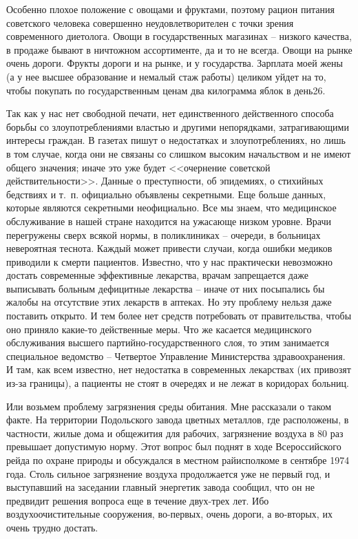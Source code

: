 \documentclass{book}
\begin{document}
Особенно плохое положение с овощами и фруктами, поэтому рацион питания советского человека совершенно неудовлетворителен с точки 
зрения современного диетолога. Овощи в государственных магазинах -- низкого качества, в продаже бывают в ничтожном ассортименте, 
да и то не всегда. Овощи на рынке очень дороги. Фрукты дороги и на рынке, и у государства. Зарплата моей жены (а у нее высшее 
образование и немалый стаж работы) целиком уйдет на то, чтобы покупать по государственным ценам два килограмма яблок в день26.

Так как у нас нет свободной печати, нет единственного действенного способа борьбы со злоупотреблениями властью и другими 
непорядками, затрагивающими интересы граждан. В газетах пишут о недостатках и злоупотреблениях, но лишь в том случае, когда они 
не связаны со слишком высоким начальством и не имеют общего значения; иначе это уже будет <<очернение советской 
действительности>>. Данные о преступности, об эпидемиях, о стихийных бедствиях и т.~п. официально объявлены секретными. Еще 
больше данных, которые являются секретными неофициально. Все мы знаем, что медицинское обслуживание в нашей стране находится на 
ужасающе низком уровне. Врачи перегружены сверх всякой нормы, в поликлиниках -- очереди, в больницах невероятная теснота. Каждый 
может привести случаи, когда ошибки медиков приводили к смерти пациентов. Известно, что у нас практически невозможно достать 
современные эффективные лекарства, врачам запрещается даже выписывать больным дефицитные лекарства -- иначе от них посыпались бы 
жалобы на отсутствие этих лекарств в аптеках. Но эту проблему нельзя даже поставить открыто. И тем более нет средств потребовать 
от правительства, чтобы оно приняло какие-то действенные меры. Что же касается медицинского обслуживания высшего 
партийно-государственного слоя, то этим занимается специальное ведомство -- Четвертое Управление Министерства здравоохранения. И 
там, как всем известно, нет недостатка в современных лекарствах (их при­возят из-за границы), а пациенты не стоят в очередях и не 
лежат в коридорах больниц.

Или возьмем проблему загрязнения среды обитания. Мне рассказали о таком факте. На территории Подольского завода цветных 
металлов, где расположены, в частности, жилые дома и общежития для рабочих, загрязнение воздуха в 80 раз превышает допустимую 
норму. Этот вопрос был поднят в ходе Всероссийского рейда по охране природы и обсуждался в местном райисполкоме в сентябре 1974 
года. Столь сильное загрязнение воздуха продолжается уже не первый год, и выступавший на заседании главный энергетик завода 
сообщил, что он не предвидит решения вопроса еще в течение двух-трех лет. Ибо воздухоочистительные сооружения, во-первых, очень 
дороги, а во-вторых, их очень трудно достать.
\end{document}
